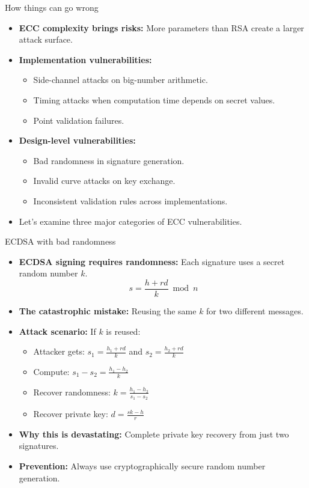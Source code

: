 \documentclass[aspectratio=169, lualatex, handout]{beamer}
\begin{document}
\begin{frame}{How things can go wrong}
	\begin{itemize}
		\item \textbf{ECC complexity brings risks:} More parameters than RSA create a larger attack surface.
		\item \textbf{Implementation vulnerabilities:}
		      \begin{itemize}
			      \item Side-channel attacks on big-number arithmetic.
			      \item Timing attacks when computation time depends on secret values.
			      \item Point validation failures.
		      \end{itemize}
		\item \textbf{Design-level vulnerabilities:}
		      \begin{itemize}
			      \item Bad randomness in signature generation.
			      \item Invalid curve attacks on key exchange.
			      \item Inconsistent validation rules across implementations.
		      \end{itemize}
		\item Let's examine three major categories of ECC vulnerabilities.
	\end{itemize}
\end{frame}

\begin{frame}{ECDSA with bad randomness}
	\begin{itemize}
		\item \textbf{ECDSA signing requires randomness:} Each signature uses a secret random number $k$.
		      $$s = \frac{h + rd}{k} \bmod n$$
		\item \textbf{The catastrophic mistake:} Reusing the same $k$ for two different messages.
		\item \textbf{Attack scenario:} If $k$ is reused:
		      \begin{itemize}
			      \item Attacker gets: $s_1 = \frac{h_1 + rd}{k}$ and $s_2 = \frac{h_2 + rd}{k}$
			      \item Compute: $s_1 - s_2 = \frac{h_1 - h_2}{k}$
			      \item Recover randomness: $k = \frac{h_1 - h_2}{s_1 - s_2}$
			      \item Recover private key: $d = \frac{sk - h}{r}$
		      \end{itemize}
		\item \textbf{Why this is devastating:} Complete private key recovery from just two signatures.
		\item \textbf{Prevention:} Always use cryptographically secure random number generation.
	\end{itemize}
\end{frame}
\end{document}
